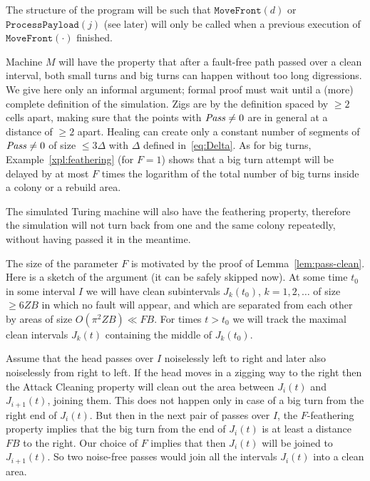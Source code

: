 \documentclass[11pt]{memoir}
\theoremstyle{definition} %
\renewcommand{\le}{\leq}
\renewcommand{\ge}{\geq}
\newcommand{\fld}[1]{\ensuremath{\textit{#1\/}}}
\newcommand{\rul}[1]{\ensuremath{\texttt{#1}}}
\def\B{B}
\newcommand{\F}{F}
\newcommand{\passno}{\pi}
\newcommand{\Z}{Z} %
\newcommand{\Pass}{\fld{Pass}} %
\newcommand{\MoveFront}{\rul{MoveFront}}
\newcommand{\ProcessPayload}{\rul{ProcessPayload}}
\begin{document}
\begin{remark}\label{rem:MoveFront}
  The structure of the program will be such that \( \MoveFront(d) \) or \( \ProcessPayload(j) \) (see later)
  will only be called when a previous execution of \( \MoveFront(\cdot) \) finished.
\end{remark}

Machine \( M \) will have the property that after a fault-free
path passed over a clean interval, both small turns and big turns can happen without too
long digressions.
We give here only an informal argument; formal proof must wait until 
a (more) complete definition of the simulation.
Zigs are by the definition spaced by \( \ge 2 \) cells apart, making sure that the points
with \( \Pass \ne 0 \) are in general at a distance of \( \ge 2 \) apart.
Healing can create only a constant number of segments of \( \Pass\ne 0 \) of size \( \le 3\Delta \)
with \( \Delta \) defined in~\eqref{eq:Delta}.
As for big turns, Example~\ref{xpl:feathering} (for \( \F=1 \)) shows that
a big turn attempt will be delayed by at most \( \F \) times the logarithm
of the total number of big turns inside a colony or a rebuild area.

The simulated Turing machine will also have the feathering property,
therefore the simulation will not turn back 
from one and the same colony repeatedly, without having passed it in the meantime.

\begin{sloppypar}
\begin{remark}\label{rem:big-turns}
  The size of the parameter \( \F \) is motivated by the proof of Lemma~\ref{lem:pass-clean}.
  Here is a sketch of the argument (it can be safely skipped now).
   At some time \( t_{0} \) in some interval \( I \)
  we will have clean subintervals \( J_{k}(t_{0}) \), \( k=1,2,\dots \)
  of size \( \ge 6\Z\B \) in which no fault will appear, and which are separated from each other by areas of
  size \( O(\passno^{2}\Z\B)\ll\F\B \).
  For times \( t>t_{0} \) we will track the maximal clean intervals \( J_{k}(t) \) containing
  the middle of \( J_{k}(t_{0}) \).

  Assume that the head passes over \( I \) noiselessly left to right and later
  also noiselessly from right to left.
  If the head moves in a zigging way to the
  right then the Attack Cleaning property will clean out the area between \( J_{i}(t) \) and \( J_{i+1}(t) \),
  joining them.
  This does not happen only in case of a big turn from the right end of \( J_{i}(t) \).
  But then in the next pair of passes over \( I \), the \( \F \)-feathering property implies that
  the big turn from the end of \( J_{i}(t) \) is at least a distance \( \F\B \) to the right.
  Our choice of \( \F \) implies that then \( J_{i}(t) \) will be joined to \( J_{i+1}(t) \).
  So two noise-free passes would join all the intervals \( J_{i}(t) \) into a clean area.  
\end{remark}  
\end{sloppypar}
\end{document}
